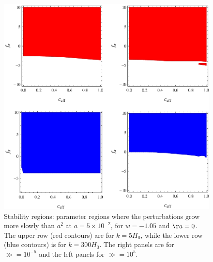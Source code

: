 \begin{figure}[tb]
\centering 
\includegraphics[scale=1]{figures/chapter-ade/stability2.pdf} 
\caption{Stability regions: parameter regions where the perturbations grow more slowly than $a^2$ at $a=5\times10^{-2}$, for $w=-1.05$ and $\aa=0$. The upper row (red contours) are for $k=5 H_0$, while the lower row (blue contours) is for $k=300 H_0$. The right panels are for $ \gg = 10^{-5} $ and the left panels for $ \gg=10^5 $.}
\label{fig:stability:2}
\end{figure} 